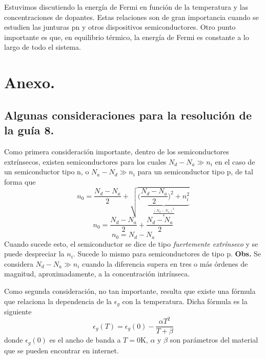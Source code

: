 \documentclass[12pt,a4paper]{article}
\begin{document}
Estuvimos discutiendo la energía de Fermi en función de la temperatura y las concentraciones de dopantes. Estas relaciones son de gran importancia cuando se estudien las junturas pn y otros dispositivos semiconductores. Otro punto importante es que, en equilibrio térmico, la energía de Fermi es constante a lo largo de todo el sistema.

\section{Anexo.}

\subsection*{Algunas consideraciones para la resolución de la guía 8.}

Como primera consideración importante, dentro de los semiconductores extrínsecos, existen semiconductores para los cuales $N_{d} - N_{a} \gg n_{i}$ en el caso de un semiconductor tipo n, o $N_{a} - N_{d} \gg n_{i}$ para un semiconductor tipo p, de tal forma que
\[ n_{0} = \frac{N_{d} - N_{a}}{2} + \sqrt{ \underbrace { \bigg( \frac{N_{d} - N_{a}}{2} \bigg)^{2} + n_{i}^{2} }_{ \frac{ (N_{d} - N_{a})^{2} }{4} } } \]
\[ n_{0} = \frac{N_{d} - N_{a}}{2} +\frac{N_{d} - N_{a}}{2} \]
\[ n_{0} = N_{d} - N_{a} \]
Cuando sucede esto, el semiconductor se dice de tipo \emph{fuertemente extrínseco} y se puede despreciar la $n_{i}$. Sucede lo mismo para semiconductores de tipo p. \textbf{Obs.} Se considera $N_{d}-N_{a} \gg n_{i}$ cuando la diferencia supera en tres o más órdenes de magnitud, aproximadamente, a la concentración intrínseca.

Como segunda consideración, no tan importante, resulta que existe una fórmula que relaciona la dependencia de la $\epsilon _{g}$ con la temperatura. Dicha fórmula es la siguiente
\[ \epsilon _{g} (T) = \epsilon _{g} (0) - \frac{\alpha T^{2}}{T+\beta} \]
donde $\epsilon _{g} (0)$ es el ancho de banda a $T=0$K, $\alpha$ y $\beta$ son parámetros del material que se pueden encontrar en internet.
\end{document}
